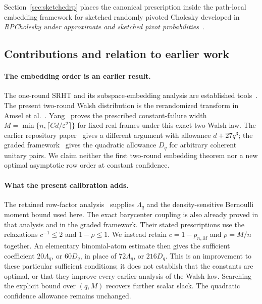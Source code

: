\documentclass[11pt,a4paper]{article}
\theoremstyle{definition}
\theoremstyle{remark}
\numberwithin{equation}{section}
\newcommand{\eps}{\varepsilon}
\begin{document}
Section~\ref{sec:sketchedrp} places the canonical prescription inside the
path-local embedding framework for sketched randomly pivoted Cholesky
developed in \emph{RPCholesky under approximate and sketched pivot
probabilities}~\cite{RobustRP}.

\subsection{Contributions and relation to earlier work}

\paragraph{The embedding order is an earlier result.}
The one-round SRHT and its subspace-embedding analysis are established
tools~\cite{AilonChazelle,DMMS,TroppSRHT,BoutsidisGittens}.
The present two-round Walsh distribution is the rerandomized transform in
Amsel et al.~\cite[Definition~5.3 and Problem~5.6]{Amsel}.
Yang~\cite[Theorem~1]{Yang} proves the prescribed constant-failure width
$M=\min\{n,\lceil C d/\eps^2\rceil\}$ for fixed real frames under this exact two-Walsh law.
The earlier repository paper~\cite{SRHT2R} gives a different argument with
allowance $d+27q^3$; the graded framework~\cite[Theorem~10.1]{V11}
gives the quadratic allowance $D_q$ for arbitrary coherent unitary pairs.
We claim neither the first two-round embedding theorem nor a new optimal
asymptotic row order at constant confidence.

\paragraph{What the present calibration adds.}
The retained row-factor analysis~\cite[Theorem~4.1]{HY} supplies
$\Lambda_q$ and the density-sensitive Bernoulli moment bound used here.
The exact barycenter coupling is also already proved in that analysis and
in the graded framework. Their stated prescriptions use the relaxations
$c^{-1}\le2$ and $1-\rho\le1$. We instead retain
$c=1-p_{n,M}$ and $\rho=M/n$ together. An elementary binomial-atom estimate
then gives the sufficient coefficient $20\Lambda_q$, or $60D_q$, in place
of $72\Lambda_q$, or $216D_q$. This is an improvement to these particular
sufficient conditions; it does not establish that the constants are
optimal, or that they improve every earlier analysis of the Walsh law.
Searching the explicit bound over $(q,M)$ recovers further scalar slack.
The quadratic confidence allowance remains unchanged.
\end{document}
